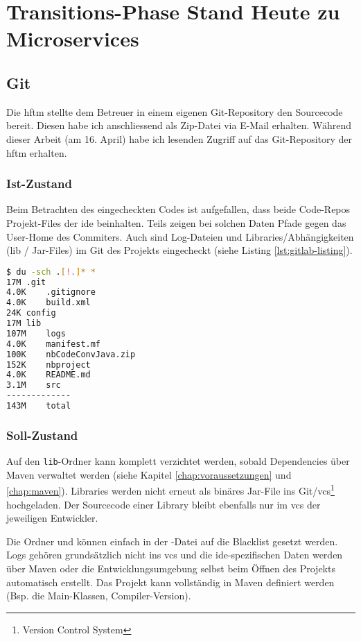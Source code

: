 \chapter{Transitions-Phase Stand Heute zu Microservices}
\section{Git}
\label{chap:tranition-git}
Die \acrshort{hftm} stellte dem Betreuer in einem eigenen Git-Repository den Sourcecode bereit. Diesen habe ich anschliessend als Zip-Datei via E-Mail erhalten. Während dieser Arbeit (am 16. April) habe ich lesenden Zugriff auf das Git-Repository der \acrshort{hftm} erhalten\cite{gitlab.com/solidus/hefei}. 

\subsection{Ist-Zustand}
Beim Betrachten des eingecheckten Codes ist aufgefallen, dass beide Code-Repos Projekt-Files der \acrshort{ide} beinhalten. Teils zeigen bei solchen Daten Pfade gegen das User-Home des Commiters. Auch sind Log-Dateien und Libraries/Abhängigkeiten (lib / Jar-Files) im Git des Projekts eingecheckt (siehe Listing \ref{lst:gitlab-listing}). 
\begin{lstlisting}[caption={Listing der Daten im Git-Repository 'gitlab.com/solidus/hefei'},language=Bash, columns=fixed,label={lst:gitlab-listing}]
$ du -sch .[!.]* *
17M	.git
4.0K	.gitignore
4.0K	build.xml
24K	config
17M	lib
107M	logs
4.0K	manifest.mf
100K	nbCodeConvJava.zip
152K	nbproject
4.0K	README.md
3.1M	src
-------------
143M	total
\end{lstlisting}
\subsection{Soll-Zustand}
Auf den \verb|lib|-Ordner kann komplett verzichtet werden, sobald Dependencies über Maven verwaltet werden (siehe Kapitel \ref{chap:voraussetzungen} und \ref{chap:maven}). Libraries werden nicht erneut als binäres Jar-File ins Git/\acrshort{vcs}\footnote{Version Control System} hochgeladen. Der Sourcecode einer Library bleibt ebenfalls nur im \acrshort{vcs} der jeweiligen Entwickler.

Die Ordner  und  können einfach in der -Datei auf die Blacklist gesetzt werden. Logs gehören grundsätzlich nicht ins \acrshort{vcs} und die \acrshort{ide}-spezifischen Daten werden über Maven oder die Entwicklungsumgebung selbst beim Öffnen des Projekts automatisch erstellt. Das Projekt kann vollständig in Maven definiert werden (Bsp. die Main-Klassen, Compiler-Version).

